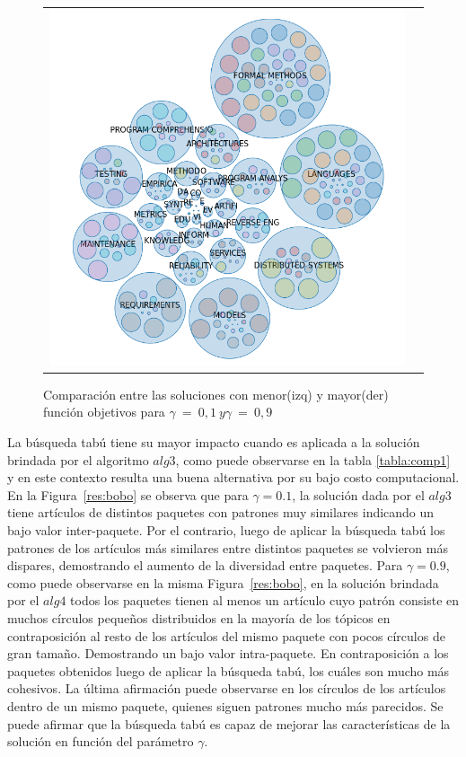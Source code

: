 \begin{figure}[H]
\begin{tabular}{cc}
		\includegraphics[width=0.45\linewidth]{img/gamma-09-burbujas-alg-1.png}\\
	\end{tabular}
	\caption{Comparación entre las soluciones con menor(izq) y mayor(der) función objetivos  para $\gamma\ =\ 0,1\ y \gamma\ =\ 0,9$}
	\label{res:comp1}
\end{figure}

La búsqueda tabú tiene su mayor impacto cuando es aplicada a la solución brindada por el algoritmo $alg3$, como puede observarse en la tabla \autoref{tabla:comp1} y en este contexto resulta una buena alternativa por su bajo costo computacional. En la Figura~\ref{res:bobo} se observa que para $\gamma=0.1$, la solución dada por el $alg3$ tiene artículos de distintos paquetes con patrones muy similares indicando un bajo valor inter-paquete. Por el contrario, luego de aplicar la búsqueda tabú los patrones de los artículos más similares entre distintos paquetes se volvieron más dispares, demostrando el aumento de la diversidad entre paquetes. Para $\gamma=0.9$, como puede observarse en la misma Figura~\ref{res:bobo}, en la solución brindada por el $alg4$ todos los paquetes tienen al menos un artículo cuyo patrón consiste en muchos círculos pequeños distribuidos en la mayoría de los tópicos en contraposición al resto de los artículos del mismo paquete con pocos círculos de gran tamaño. Demostrando un bajo valor intra-paquete. En contraposición a los paquetes obtenidos luego de aplicar la búsqueda tabú, los cuáles son mucho más cohesivos. La última afirmación puede observarse en los círculos de los artículos dentro de un mismo paquete, quienes siguen patrones mucho más parecidos. Se puede afirmar que la búsqueda tabú es capaz de mejorar las características de la solución en función del parámetro $\gamma$.

